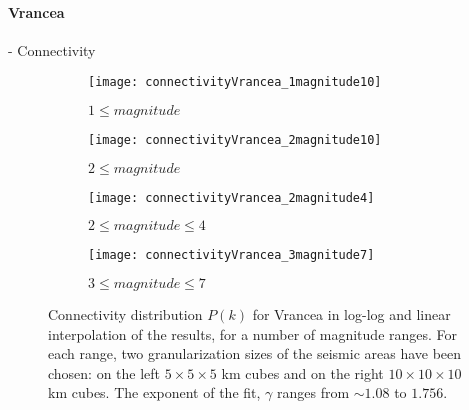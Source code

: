 \paragraph{Vrancea} - Connectivity
\begin{figure}[!h]
\begin{subfigure}{.99\textwidth}
  \centering
  \texttt{[image: connectivityVrancea\_1magnitude10]}
  \caption{$1 \leq magnitude$}
  \label{fig:conVr1mag10}
\end{subfigure}%

\begin{subfigure}{.99\textwidth}
  \centering
  \texttt{[image: connectivityVrancea\_2magnitude10]}
  \caption{$2 \leq magnitude$}
  \label{fig:conVr2mag10}
\end{subfigure}%

\begin{subfigure}{.99\textwidth}
  \centering
  \texttt{[image: connectivityVrancea\_2magnitude4]}
  \caption{$2\leq magnitude \leq 4$}
  \label{fig:conVr2mag14}
\end{subfigure}%

\begin{subfigure}{.99\textwidth}
  \centering
  \texttt{[image: connectivityVrancea\_3magnitude7]}
  \caption{$3 \leq magnitude \leq 7$}
  \label{fig:conVr3mag7}
\end{subfigure}%

\caption{Connectivity distribution $P(k)$ for Vrancea in log-log and linear interpolation of the results, for a number of magnitude ranges. For each range, two granularization sizes of the seismic areas have been chosen: on the left $5 \times 5 \times5 $ km cubes and on the right $10 \times 10 \times 10$ km cubes. The exponent of the fit, $\gamma$ ranges from $\sim 1.08$ to $1.756$.}
\label{fig:connectivityVr}
\end{figure}

\clearpage
